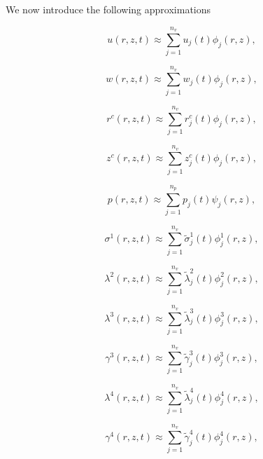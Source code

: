\documentclass{article}
\begin{document}
We now introduce the following approximations

\begin{equation}
u(r,z,t) \approx \sum_{j=1}^{n_v} u_j(t) \phi_j(r,z), \tag{4.66}
\end{equation}

\begin{equation}
w(r,z,t) \approx \sum_{j=1}^{n_v} w_j(t) \phi_j(r,z), \tag{4.67}
\end{equation}

\begin{equation}
r^c(r,z,t) \approx \sum_{j=1}^{n_v} r_j^c(t) \phi_j(r,z), \tag{4.68}
\end{equation}

\begin{equation}
z^c(r,z,t) \approx \sum_{j=1}^{n_v} z_j^c(t) \phi_j(r,z), \tag{4.69}
\end{equation}

\begin{equation}
p(r,z,t) \approx \sum_{j=1}^{n_p} p_j(t) \psi_j(r,z), \tag{4.70}
\end{equation}

\begin{equation}
\sigma^1(r,z,t) \approx \sum_{j=1}^{n_v} \tilde{\sigma}_j^1(t) \phi_j^1(r,z), \tag{4.71}
\end{equation}

\begin{equation}
\lambda^2(r,z,t) \approx \sum_{j=1}^{n_v} \tilde{\lambda}_j^2(t) \phi_j^2(r,z), \tag{4.72}
\end{equation}

\begin{equation}
\lambda^3(r,z,t) \approx \sum_{j=1}^{n_v} \tilde{\lambda}_j^3(t) \phi_j^3(r,z), \tag{4.73}
\end{equation}

\begin{equation}
\gamma^3(r,z,t) \approx \sum_{j=1}^{n_v} \tilde{\gamma}_j^3(t) \phi_j^3(r,z), \tag{4.74}
\end{equation}

\begin{equation}
\lambda^4(r,z,t) \approx \sum_{j=1}^{n_v} \tilde{\lambda}_j^4(t) \phi_j^4(r,z), \tag{4.75}
\end{equation}

\begin{equation}
\gamma^4(r,z,t) \approx \sum_{j=1}^{n_v} \tilde{\gamma}_j^4(t) \phi_j^4(r,z), \tag{4.76}
\end{equation}
\end{document}
